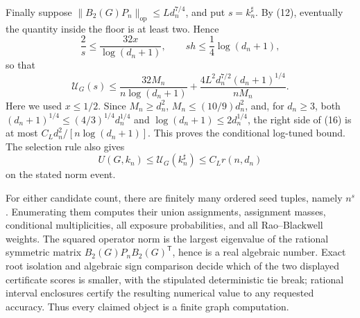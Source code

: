 Finally suppose \(\|B_2(G)P_n\|_{\mathrm{op}}\le Ld_n^{7/4}\), and put
\(s=k_n^\sharp\).  By (12), eventually the quantity inside the floor is at least two.  Hence
\[
\frac2s\le\frac{32x}{\log(d_n+1)},
\qquad
sh\le\frac14\log(d_n+1),
\]
so that
\[
\mathcal U_G(s)
\le\frac{32M_n}{n\log(d_n+1)}
+\frac{4L^2d_n^{7/2}(d_n+1)^{1/4}}{nM_n}.
\tag{16}
\]
Here we used \(x\le1/2\).  Since \(M_n\ge d_n^2\), \(M_n\le(10/9)d_n^2\), and, for \(d_n\ge3\), both \((d_n+1)^{1/4}\le(4/3)^{1/4}d_n^{1/4}\) and \(\log(d_n+1)\le2d_n^{1/4}\), the right side of (16) is at most \(C_Ld_n^2/[n\log(d_n+1)]\).  This proves the conditional log-tuned bound.
The selection rule also gives
\[
U(G,k_n)\le\mathcal U_G(k_n^\sharp)\le C_Lr(n,d_n)
\]
on the stated norm event.

For either candidate count, there are finitely many ordered seed tuples, namely \(n^s\).  Enumerating them computes their union assignments, assignment masses, conditional multiplicities, all exposure probabilities, and all Rao--Blackwell weights.  The squared operator norm is the largest eigenvalue of the rational symmetric matrix \(B_2(G)P_nB_2(G)^{\mathsf T}\), hence is a real algebraic number.  Exact root isolation and algebraic sign comparison decide which of the two displayed certificate scores is smaller, with the stipulated deterministic tie break; rational interval enclosures certify the resulting numerical value to any requested accuracy.  Thus every claimed object is a finite graph computation.

